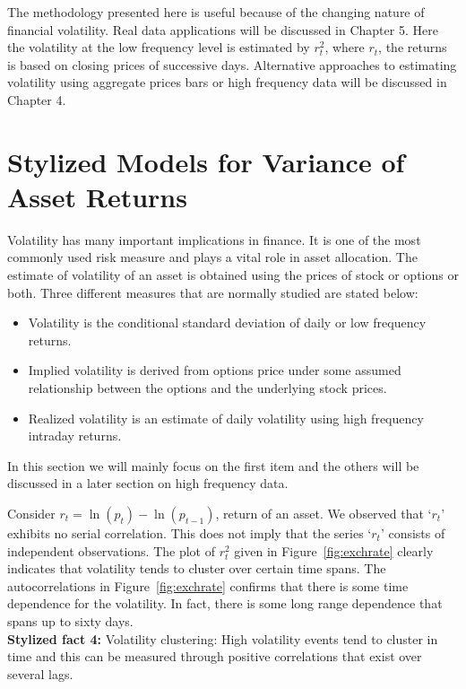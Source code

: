 The methodology presented here is useful because of the changing nature of financial volatility. Real data applications will be discussed in Chapter 5. Here the volatility at the low frequency level is estimated by $r_t^2$, where $r_t$, the returns is based on closing prices of successive days. Alternative approaches to estimating volatility using aggregate prices bars or high frequency data will be discussed in Chapter 4. 


\section{Stylized Models for Variance of Asset Returns}


Volatility has many important implications in finance. It is one of the most commonly
used risk measure and plays a vital role in asset allocation. The estimate of volatility of an asset is obtained using the prices of stock or options or both. Three different measures that are normally studied are stated below:
\begin{itemize}
\item Volatility is the conditional standard deviation of daily or low frequency returns.

\item Implied volatility is derived from options price under some assumed
relationship between the options and the underlying stock prices.

\item Realized volatility is an estimate of daily volatility using high frequency
intraday returns.
\end{itemize}
In this section we will mainly focus on the first item and the others will be discussed in a later section on high frequency data.


Consider $r_t = \ln{(p_t) - \ln{(p_{t-1})}}$, return of an asset. We observed that `$r_t$' exhibits no serial correlation. This does not imply that the series `$r_t$' consists of independent observations. The plot of $r_t^2$ given in Figure~\ref{fig:exchrate} clearly indicates that volatility tends to cluster over certain time spans. The autocorrelations in Figure~\ref{fig:exchrate} confirms that there is some time dependence for the volatility. In fact, there is some long range dependence that spans up to sixty days. \\


\noindent\textbf{Stylized fact 4:} Volatility clustering: High volatility events tend to cluster in time and this can be measured through positive correlations that exist over several lags.



